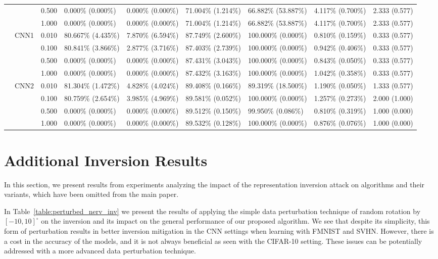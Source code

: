 \documentclass[conference,compsoc]{IEEEtran}
\begin{document}
\begin{landscape}
\begin{table}[H]
\begin{tabular}{lllllllll}
& & 0.500 & 0.000\% (0.000\%) & 0.000\% (0.000\%) & 71.004\% (1.214\%) & 66.882\% (53.887\%) & 4.117\% (0.700\%) & 2.333 (0.577) \\
& & 1.000 & 0.000\% (0.000\%) & 0.000\% (0.000\%) & 71.004\% (1.214\%) & 66.882\% (53.887\%) & 4.117\% (0.700\%) & 2.333 (0.577) \\
\cline{2-9}
& \multirow{4}{*}{CNN1} & 0.010 & 80.667\% (4.435\%) & 7.870\% (6.594\%) & 87.749\% (2.600\%) & 100.000\% (0.000\%) & 0.810\% (0.159\%) & 0.333 (0.577) \\
& & 0.100 & 80.841\% (3.866\%) & 2.877\% (3.716\%) & 87.403\% (2.739\%) & 100.000\% (0.000\%) & 0.942\% (0.406\%) & 0.333 (0.577) \\
& & 0.500 & 0.000\% (0.000\%) & 0.000\% (0.000\%) & 87.431\% (3.043\%) & 100.000\% (0.000\%) & 0.843\% (0.050\%) & 0.333 (0.577) \\
& & 1.000 & 0.000\% (0.000\%) & 0.000\% (0.000\%) & 87.432\% (3.163\%) & 100.000\% (0.000\%) & 1.042\% (0.358\%) & 0.333 (0.577) \\
\cline{2-9}
& \multirow{4}{*}{CNN2} & 0.010 & 81.304\% (1.472\%) & 4.828\% (4.024\%) & 89.408\% (0.166\%) & 89.319\% (18.500\%) & 1.190\% (0.050\%) & 1.333 (0.577) \\
& & 0.100 & 80.759\% (2.654\%) & 3.985\% (4.969\%) & 89.581\% (0.052\%) & 100.000\% (0.000\%) & 1.257\% (0.273\%) & 2.000 (1.000) \\
& & 0.500 & 0.000\% (0.000\%) & 0.000\% (0.000\%) & 89.512\% (0.150\%) & 99.950\% (0.086\%) & 0.810\% (0.319\%) & 1.000 (0.000) \\
& & 1.000 & 0.000\% (0.000\%) & 0.000\% (0.000\%) & 89.532\% (0.128\%) & 100.000\% (0.000\%) & 0.876\% (0.076\%) & 1.000 (0.000) \\
\hline
\end{tabular}
\end{table}

\end{landscape}

\section{Additional Inversion Results}

In this section, we present results from experiments analyzing the impact of the representation inversion attack on algorithms and their variants, which have been omitted from the main paper.

\noindent In Table~\ref{table:perturbed_nerv_inv} we present the results of applying the simple data perturbation technique of random rotation by $[-10, 10]^\circ$ on the inversion and its impact on the general performance of our proposed algorithm. We see that despite its simplicity, this form of perturbation results in better inversion mitigation in the CNN settings when learning with FMNIST and SVHN. However, there is a cost in the accuracy of the models, and it is not always beneficial as seen with the CIFAR-10 setting. These issues can be potentially addressed with a more advanced data perturbation technique.
\end{document}
